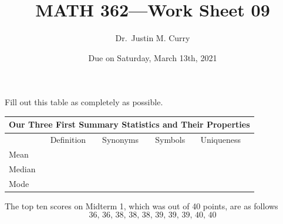 \documentclass[addpoints,12pt]{exam}
\title{\vspace{-1in} MATH 362---Work Sheet 09}
\date{Due on Saturday, March 13th, 2021}
\author{Dr.~Justin M. Curry}
\begin{document}
\maketitle


\begin{questions}

\question[3] Fill out this table as completely as possible.
\begin{center}
\begin{tabular}{ |p{1.5cm}|p{5cm}|p{3cm}|p{2cm}|p{2cm}| }
\hline
\multicolumn{5}{|c|}{Our Three First Summary Statistics and Their Properties} \\
\hline
& Definition & Synonyms &Symbols & Uniqueness \\
\hline
Mean & \vspace{.75in} & & & \\
%
\hline
Median & \vspace{.75in} & & & \\
\hline
Mode &  \vspace{.75in} & & & \\
\hline
\end{tabular}
\end{center}

\question[6] The top ten scores on Midterm 1, which was out of 40 points, are as follows
\[
	36, \, 36, \, 38, \, 38, \, 38, \, 39, \, 39, \, 39, \,40, \, 40 
\]

\noaddpoints
{}
\end{questions}
\end{document}
